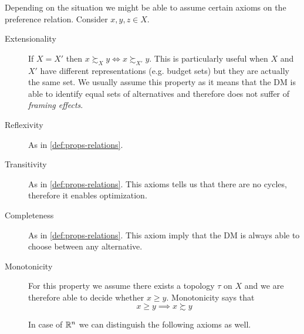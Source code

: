 \documentclass[12pt]{extarticle}
\begin{document}
Depending on the situation we might be able to assume certain axioms on the preference relation.
Consider $x, y, z \in X$.
\begin{description}
    \item[Extensionality]
          If $X = X'$ then $x \succsim_X y \iff x \succsim_{X'} y$.
          This is particularly useful when $X$ and $X'$ have different representations (e.g. budget sets)
          but they are actually the same set.
          We usually assume this property as it means that the DM is able to identify equal sets of alternatives
          and therefore does not suffer of \emph{framing effects}.

    \item[Reflexivity] As in \cref{def:props-relations}.
    \item[Transitivity] As in \cref{def:props-relations}.
          This axioms tells us that there are no cycles,
          therefore it enables optimization.
    \item[Completeness] As in \cref{def:props-relations}.
          This axiom imply that the DM is always able to choose between any alternative.

    \item[Monotonicity] For this property we assume there exists a topology $\tau$ on $X$
          and we are therefore able to decide whether $x \geq y$.
          Monotonicity says that
          \begin{equation}
              x \geq y \implies x \succsim y
          \end{equation}

          In case of $\mathbb{R}^n$ we can distinguish the following axioms as well.


\end{description}
\end{document}

